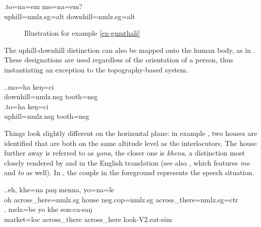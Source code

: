 \exg.\label{ex-gumthali}to=na=em mo=na=em?\\
uphill{\sc =nmlz.sg=alt} downhill{\sc =nmlz.sg=alt}\\

\begin{figure}
\centering
\setlength{\fboxsep}{0pt}
\caption{Illustration for example \ref{ex-gumthali}}\label{deixill-2}
\end{figure}

The uphill-downhill distinction can also be mapped onto the human body, as in \Next. These designations are used regardless of the orientation of a person, thus instantiating an exception to the topography-based system.

\ex.\ag.mo=ha keŋ=ci \\
downhill{\sc =nmlz.nsg} tooth{\sc =nsg} \\
\bg.to=ha keŋ=ci\\
uphill{\sc =nmlz.nsg} tooth{\sc =nsg} \\


Things look slightly different on the horizontal plane: in example \Next[a], two houses are identified  that are both on the same altitude level as the interlocutors. The house further away is referred to as \emph{yona}, the closer one is \emph{khena}, a distinction most closely rendered by  and  in the English translation (see also , which  features  \emph{mo} and \emph{to} as well). In , the couple in the foreground represents the speech situation.

\ex.\ag.\label{khenamenna}eh, khe=na paŋ menna, yo=na=le\\
oh across\_here{\sc =nmlz.sg} house {\sc neg.cop=nmlz.sg} across\_there{\sc =nmlz.sg=ctr}\\
 \bg. mela=be      yo   khe    son-ca-saŋ\\
market{\sc =loc} across\_there across\_here look{\sc -V2.eat-sim} \\
 
 
